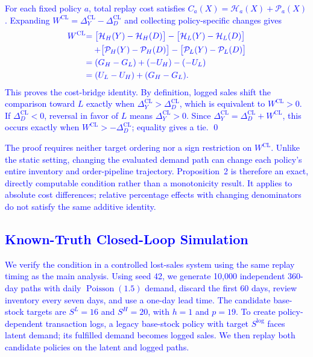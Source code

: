 \documentclass[msom,dblanonrev]{informs4}
\newcommand{\add}[1]{\textcolor{blue}{#1}}
\begin{document}
\proof{\add{Proof of Proposition 2.}}
\add{For each fixed policy $a$, total replay cost satisfies $C_a(X)=\mathcal H_a(X)+\mathcal P_a(X)$. Expanding $W^{\mathrm{CL}}=\Delta_Y^{\mathrm{CL}}-\Delta_D^{\mathrm{CL}}$ and collecting policy-specific changes gives}
\begin{equation}\label{eq:oa-closed-loop-proof}
\begin{aligned}
\add{W^{\mathrm{CL}}}
&\add{=\bigl[\mathcal H_H(Y)-\mathcal H_H(D)\bigr]-\bigl[\mathcal H_L(Y)-\mathcal H_L(D)\bigr]}\\
&\quad\add{+\bigl[\mathcal P_H(Y)-\mathcal P_H(D)\bigr]-\bigl[\mathcal P_L(Y)-\mathcal P_L(D)\bigr]}\\
&\add{=(G_H-G_L)+(-U_H)-(-U_L)}\\
&\add{=(U_L-U_H)+(G_H-G_L).}
\end{aligned}
\end{equation}
\add{This proves the cost-bridge identity. By definition, logged sales shift the comparison toward $L$ exactly when $\Delta_Y^{\mathrm{CL}}>\Delta_D^{\mathrm{CL}}$, which is equivalent to $W^{\mathrm{CL}}>0$. If $\Delta_D^{\mathrm{CL}}<0$, reversal in favor of $L$ means $\Delta_Y^{\mathrm{CL}}>0$. Since $\Delta_Y^{\mathrm{CL}}=\Delta_D^{\mathrm{CL}}+W^{\mathrm{CL}}$, this occurs exactly when $W^{\mathrm{CL}}> -\Delta_D^{\mathrm{CL}}$; equality gives a tie. \qed}
\endproof

\add{The proof requires neither target ordering nor a sign restriction on $W^{\mathrm{CL}}$. Unlike the static setting, changing the evaluated demand path can change each policy's entire inventory and order-pipeline trajectory. Proposition~2 is therefore an exact, directly computable condition rather than a monotonicity result. It applies to absolute cost differences; relative percentage effects with changing denominators do not satisfy the same additive identity.}

\subsection{\add{Known-Truth Closed-Loop Simulation}}

\add{We verify the condition in a controlled lost-sales system using the same replay timing as the main analysis. Using seed 42, we generate 10{,}000 independent 360-day paths with daily $\operatorname{Poisson}(1.5)$ demand, discard the first 60 days, review inventory every seven days, and use a one-day lead time. The candidate base-stock targets are $S^L=16$ and $S^H=20$, with $h=1$ and $p=19$. To create policy-dependent transaction logs, a legacy base-stock policy with target $S^{\log}$ faces latent demand; its fulfilled demand becomes logged sales. We then replay both candidate policies on the latent and logged paths.}
\end{document}
